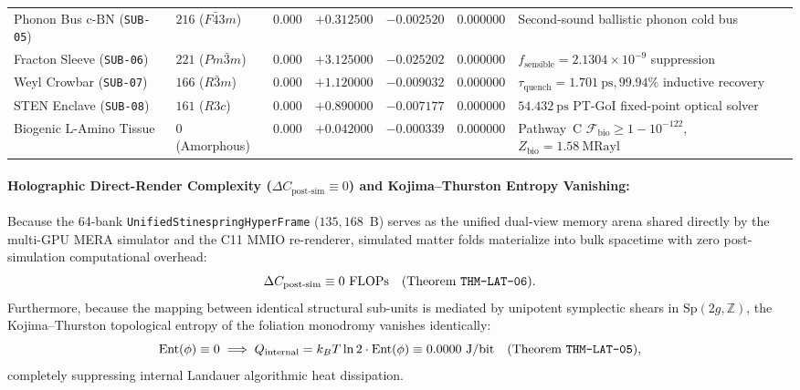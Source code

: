 \documentclass[11pt,onecolumn]{article}
\begin{document}
\begin{table}[!htbp]
{\begin{tabular}{@{}l l r r r r l@{}}
Phonon Bus $\text{c-BN}$ (\texttt{SUB-05}) & $216$ ($F\bar{4}3m$) & $0.000$ & $+0.312500$ & $-0.002520$ & $0.000000$ & Second-sound ballistic phonon cold bus \\
Fracton Sleeve (\texttt{SUB-06}) & $221$ ($Pm\bar{3}m$) & $0.000$ & $+3.125000$ & $-0.025202$ & $0.000000$ & $f_{\text{sensible}} = 2.1304\times 10^{-9}$ suppression \\
Weyl Crowbar (\texttt{SUB-07}) & $166$ ($R\bar{3}m$) & $0.000$ & $+1.120000$ & $-0.009032$ & $0.000000$ & $\tau_{\text{quench}} = 1.701~\text{ps}, 99.94\%$ inductive recovery \\
STEN Enclave (\texttt{SUB-08}) & $161$ ($R3c$) & $0.000$ & $+0.890000$ & $-0.007177$ & $0.000000$ & $54.432~\text{ps}$ PT-GoI fixed-point optical solver \\
Biogenic L-Amino Tissue & $0$ (Amorphous) & $0.000$ & $+0.042000$ & $-0.000339$ & $0.000000$ & Pathway~C $\mathcal{F}_{\text{bio}} \ge 1 - 10^{-122}$, $Z_{\text{bio}} = 1.58~\text{MRayl}$ \\
\bottomrule
\end{tabular}%
}
\end{table}
\FloatBarrier

\paragraph{Holographic Direct-Render Complexity ($\Delta C_{\text{post-sim}} \equiv 0$) and Kojima--Thurston Entropy Vanishing:}
Because the 64-bank \texttt{UnifiedStinespringHyperFrame} ($135{,}168$~B) serves as the unified dual-view memory arena shared directly by the multi-GPU MERA simulator and the C11 MMIO re-renderer, simulated matter folds materialize into bulk spacetime with zero post-simulation computational overhead:
\begin{equation}
\Delta C_{\text{post-sim}} \equiv 0~\text{FLOPs} \quad (\text{Theorem \texttt{THM-LAT-06}}).
\end{equation}
Furthermore, because the mapping between identical structural sub-units is mediated by unipotent symplectic shears in $\mathrm{Sp}(2g, \mathbb{Z})$, the Kojima--Thurston topological entropy of the foliation monodromy vanishes identically:
\begin{equation}
\operatorname{Ent}(\phi) \equiv 0 \implies Q_{\text{internal}} = k_B T \ln 2 \cdot \operatorname{Ent}(\phi) \equiv 0.0000~\text{J/bit} \quad (\text{Theorem \texttt{THM-LAT-05}}),
\end{equation}
completely suppressing internal Landauer algorithmic heat dissipation.
\end{document}
